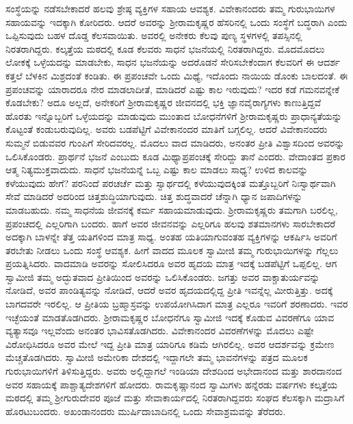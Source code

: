  ಸಂಸ್ಥೆಯನ್ನು ನಡೆಸಬೇಕಾದರೆ ಹಲವು ಶ್ರೇಷ್ಠ ವ್ಯಕ್ತಿಗಳ ಸಹಾಯ ಆವಶ್ಯಕ. ವಿವೇಕಾನಂದರು ತಮ್ಮ ಗುರುಭಾಯಿಗಳ ಸಹಾಯವನ್ನು ಇದಕ್ಕಾಗಿ ಕೋರಿದರು. ಆದರೆ ಅವರನ್ನು ಶ‍್ರೀರಾಮಕೃಷ್ಣರ ಹೆಸರಿನಲ್ಲಿ ಒಂದು ಸಂಸ್ಥೆಗೆ ಬದ್ಧರಾಗಿ ಎಂದು ಒಪ್ಪಿಸುವುದು ಬಹಳ ದೊಡ್ಡ ಕೆಲಸವಾಯಿತು. ಅವರಲ್ಲಿ ಅನೇಕರು ಕೆಲವು ಪುಣ್ಯ ಸ್ಥಳಗಳಲ್ಲಿ ತಪಸ್ಸಿನಲ್ಲಿ ನಿರತರಾಗಿದ್ದರು. ಕಲ್ಕತ್ತೆಯ ಮಠದಲ್ಲಿ ಕೂಡ ಕೆಲವರು ಸಾಧನೆ ಭಜನೆಯಲ್ಲಿ ನಿರತರಾಗಿದ್ದರು. ಮೊದಮೊದಲು ಲೋಕಕ್ಕೆ ಒಳ್ಳೆಯದನ್ನು ಮಾಡಬೇಕು, ಸಾಧನ ಭಜನೆಯನ್ನು ಅದರೊಡನೆ ಸೇರಿಸಬೇಕೆಂದಾಗ ಕೆಲವರಿಗೆ ಈ ಆದರ್ಶ ಕತ್ತಲೆ ಬೆಳಕಿನ ಮಿಶ್ರದಂತೆ ಕಂಡಿತು. ಈ ಪ್ರಪಂಚವೇ ಒಂದು ಮಿಥ್ಯೆ, ಇದೊಂದು ನಾಯಿಯ ಡೊಂಕು ಬಾಲದಂತೆ. ಈ ಪ್ರಪಂಚವನ್ನು ಯಾರಾದರೂ ನೇರ ಮಾಡಲಾದೀತೆ, ಮಾಡಿದರೆ ಎಷ್ಟು ಕಾಲ ಇರುವುದು? ಇದರ ಕಡೆ ಗಮನವನ್ನೇಕೆ ಕೊಡಬೇಕು? ಅದೂ ಅಲ್ಲದೆ, ಅನೇಕರಿಗೆ ಶ‍್ರೀರಾಮಕೃಷ್ಣರ ಜೀವನದಲ್ಲಿ ಭಕ್ತಿ ಜ್ಞಾನವೈರಾಗ್ಯಗಳು ಕಾಣುತ್ತಿದ್ದವೆ ಹೊರತು ಇನ್ನೊಬ್ಬರಿಗೆ ಒಳ್ಳೆಯದನ್ನು ಮಾಡುವುದು ಮುಂತಾದ ಬೋಧನೆಗಳಿಗೆ ಶ‍್ರೀರಾಮಕೃಷ್ಣರು ಪ್ರಾಧಾನ್ಯತೆಯನ್ನು ಕೊಟ್ಟಂತೆ ಕಂಡುಬರುವುದಿಲ್ಲ. ಅವರು ಬಡಪೆಟ್ಟಿಗೆ ವಿವೇಕಾನಂದರ ಮಾತಿಗೆ ಬಗ್ಗಲಿಲ್ಲ. ಆದರೆ ವಿವೇಕಾನಂದರು ಸುಮ್ಮನೆ ಬಿಡುವವರ ಗುಂಪಿಗೆ ಸೇರಿದವರಲ್ಲ. ಮೊದಲು ವಾದ ಮಾಡಿದರು, ಅನಂತರ ಪ್ರೀತಿ ವಿಶ್ವಾಸದಿಂದ ಅವರನ್ನು ಒಲಿಸಿಕೊಂಡರು. ಪ್ರಾರ್ಥನೆ ಭಜನೆ ಎಂಬುದು ಕೂಡ ಮಿಥ್ಯಾಪ್ರಪಂಚಕ್ಕೆ ಸೇರಿದ್ದು ತಾನೆ ಎಂದರು. ವೇದಾಂತದ ಪ್ರಕಾರ ಆತ್ಮ ನಿತ್ಯಮುಕ್ತವಾದುದು. ಸಾಧನೆ ಭಜನೆಯನ್ನೆ ಒಬ್ಬ ಎಷ್ಟು ಕಾಲ ಮಾಡಲು ಸಾಧ್ಯ? ಉಳಿದ ಕಾಲವನ್ನು ಕಳೆಯುವುದು ಹೇಗೆ? ಪರನಿಂದೆ ಪರಚರ್ಚೆ ಮತ್ತು ಸ್ವಾರ್ಥದಲ್ಲಿ ಕಳೆಯುವುದಕ್ಕಿಂತ ಮತ್ತೊಬ್ಬರಿಗೆ ನಿಃಸ್ವಾರ್ಥವಾಗಿ ಸೇವೆ ಮಾಡಿದರೆ ಅದರಿಂದ ಚಿತ್ತಶುದ್ಧಿಯಾಗುವುದು. ಚಿತ್ತ ಶುದ್ಧವಾದರೆ ಚೆನ್ನಾಗಿ ಧ್ಯಾನ ಜಪಾದಿಗಳನ್ನು ಮಾಡಬಹುದು. ನಮ್ಮ ಸಾಧನೆಯ ಜೀವನಕ್ಕೆ ಕರ್ಮ ಸಹಾಯಮಾಡುವುದು. ಶ‍್ರೀರಾಮಕೃಷ್ಣರು ತಮಗಾಗಿ ಬರಲಿಲ್ಲ, ಪ್ರಪಂಚದಲ್ಲಿ ಎಲ್ಲರಿಗಾಗಿ ಬಂದರು. ಹಾಗೆ ಅವರ ಜೀವನವನ್ನು ಎಲ್ಲರಿಗೂ ಹಲವು ಶತಮಾನಗಳು ಸಾರಬೇಕಾದರೆ ಅದಕ್ಕಾಗಿ ಬಾಳನ್ನೇ ತೆತ್ತ ಯತಿಗಳಿಂದ ಮಾತ್ರ ಸಾಧ್ಯ. ಅಂತಹ ಯತಿಯಾಗುವಂತಹ ವ್ಯಕ್ತಿಗಳನ್ನು ಆಕರ್ಷಿಸಿ ಅವರಿಗೆ ತರಬೇತು ನೀಡಲು ಒಂದು ಸಂಸ್ಥೆ ಆವಶ್ಯಕ. ಹೀಗೆ ವಾದದ ಮೂಲಕ ಸ್ವಾಮೀಜಿ ತಮ್ಮ ಗುರುಭಾಯಿಗಳನ್ನು ಗೆಲ್ಲಲು ಪ್ರಯತ್ನಿಸಿದರು. ವಾದಮಾಡಿ ಅವರನ್ನು ಸೋಲಿಸಿದರೂ ಅವರ ಹೃದಯ ಮಾತ್ರ ಇದಕ್ಕೆ ಬಡಪೆಟ್ಟಿಗೆ ಒಪ್ಪಲಿಲ್ಲ. ಆಗ ಸ್ವಾಮೀಜಿ ತಮ್ಮ ಅದ್ಭುತವಾದ ಪ್ರೀತಿಯಿಂದ ಅವರನ್ನು ಒಲಿಸಿಕೊಂಡರು. ಜಗತ್ತು ಅವರ ವಾಕ್ಚಾತುರ್ಯವನ್ನು ನೋಡಿದೆ, ಅವರ ಪಾಂಡಿತ್ಯವನ್ನು ನೋಡಿದೆ, ಆದರೆ ಅವರ ಹೃದಯದಲ್ಲಿದ್ದ ಪ್ರೀತಿ ಇವನ್ನೆಲ್ಲ ಮೀರುತ್ತಿತ್ತು. ಅದಕ್ಕೆ ಬಾಗದವರೇ ಇರಲಿಲ್ಲ. ಆ ಪ್ರೀತಿಯ ಬ್ರಹ್ಮಾಸ್ರವನ್ನು ಉಪಯೋಗಿಸಿದಾಗ ಮಾತ್ರ ಎಲ್ಲರೂ ಇವರಿಗೆ ಶರಣಾದರು. ಇವರ ಇಚ್ಛೆಯಂತೆ ಮಾಡತೊಡಗಿದರು. ಶ‍್ರೀರಾಮಕೃಷ್ಣರ ಬೋಧನೆಗೂ ಸ್ವಾಮೀಜಿ ಇದಕ್ಕೆ ಕೊಡುವ ವಿವರಣೆಗೂ ಯಾವ ವ್ಯತ್ಯಾಸವೂ ಇಲ್ಲವೆಂದು ಅನಂತರ ಭಾವಿಸತೊಡಗಿದರು. ವಿವೇಕಾನಂದರ ವಿವರಣೆಗಳನ್ನು ಮೊದಲು ಎಷ್ಟೇ ವಿರೋಧಿಸಿದರೂ ಅವರ ಮೇಲೆ ಇದ್ದ ಪ್ರೀತಿ ಮಾತ್ರ ಯಾರಿಗೂ ಕಡಿಮೆ ಆಗಿರಲಿಲ್ಲ. ಅವರ ಆದರ್ಶವನ್ನು ಕ್ರಮೇಣ ಮೆಚ್ಚತೊಡಗಿದರು. ಸ್ವಾಮೀಜಿ ಅಮೇರಿಕಾ ದೇಶದಲ್ಲಿ ಇದ್ದಾಗಲೇ ತಮ್ಮ ಭಾವನೆಗಳನ್ನು ಪತ್ರದ ಮೂಲಕ ಗುರುಭಾಯಿಗಳಿಗೆ ತಿಳಿಸುತ್ತಿದ್ದರು. ಅವರು ಅಲ್ಲಿದ್ದಾಗಲೆ ಇಂಡಿಯಾ ದೇಶದಿಂದ ಅಭೇದಾನಂದ ಮತ್ತು ಶಾರದಾನಂದ ಅವರ ಸಹಾಯಕ್ಕೆ ಪಾಶ್ಚಾತ್ಯದೇಶಗಳಿಗೆ ಹೋದರು. ರಾಮಕೃಷ್ಣಾನಂದ ಸ್ವಾಮಿಗಳು ಹನ್ನೆರಡು ವರ್ಷಗಳು ಕಲ್ಕತ್ತೆಯ ಮಠದಲ್ಲಿ ತಮ್ಮ ಶ‍್ರೀಗುರುದೇವರ ಪೂಜೆ ಮತ್ತು ಸೇವಾಕಾರ್ಯದಲ್ಲಿ ನಿರತರಾಗಿದ್ದವರು ಸಂಘದ ಕೆಲಸಕ್ಕಾಗಿ ಮದ್ರಾಸಿಗೆ ಹೊರಟುಬಂದರು. ಅಖಂಡಾನಂದರು ಮುರ್ಷಿದಾಬಾದಿನಲ್ಲಿ ಒಂದು ಸೇವಾಶ್ರಮವನ್ನು ತೆರೆದರು. 

